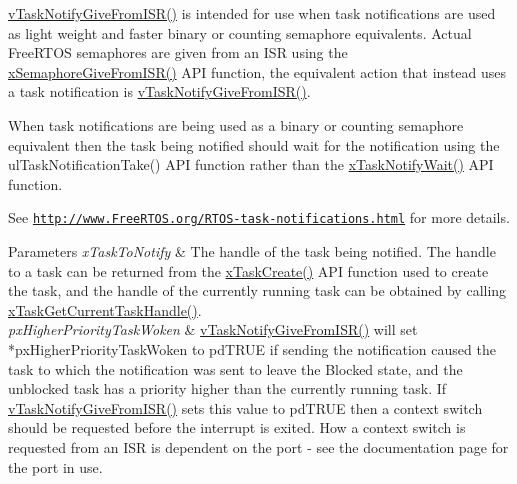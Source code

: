 \begin{DoxyPre}\hyperlink{vendor_2ceedling_2plugins_2freertos_2src_2freertos_2include_2task_8h_a4a4bcf98ad282a596e13f3f30582a11b}{vTaskNotifyGiveFromISR()} is intended for use when task notifications are
used as light weight and faster binary or counting semaphore equivalents.
Actual FreeRTOS semaphores are given from an ISR using the
\hyperlink{externals_2freertos_2include_2semphr_8h_a68aa43df8b2a0dbe17d05fad74670ef0}{xSemaphoreGiveFromISR()} API function, the equivalent action that instead uses
a task notification is \hyperlink{vendor_2ceedling_2plugins_2freertos_2src_2freertos_2include_2task_8h_a4a4bcf98ad282a596e13f3f30582a11b}{vTaskNotifyGiveFromISR()}.\end{DoxyPre}



\begin{DoxyPre}When task notifications are being used as a binary or counting semaphore
equivalent then the task being notified should wait for the notification
using the ulTaskNotificationTake() API function rather than the
\hyperlink{vendor_2ceedling_2plugins_2freertos_2src_2freertos_2include_2task_8h_a0475fcda9718f403521c270a7270ff93}{xTaskNotifyWait()} API function.\end{DoxyPre}



\begin{DoxyPre}See \href{http://www.FreeRTOS.org/RTOS-task-notifications.html}{\tt http://www.FreeRTOS.org/RTOS-task-notifications.html} for more details.\end{DoxyPre}



\begin{DoxyPre}
\begin{DoxyParams}{Parameters}
{\em xTaskToNotify} & The handle of the task being notified.  The handle to a
task can be returned from the \hyperlink{vendor_2ceedling_2plugins_2freertos_2src_2freertos_2include_2task_8h_adf67e7cd0bfd1eda9e8afd048206f7c2}{xTaskCreate()} API function used to create the
task, and the handle of the currently running task can be obtained by calling
\hyperlink{externals_2freertos_2include_2task_8h_a85a0f9c9f817b18686efbf8f37c72dfc}{xTaskGetCurrentTaskHandle()}.\\
\hline
{\em pxHigherPriorityTaskWoken} & \hyperlink{vendor_2ceedling_2plugins_2freertos_2src_2freertos_2include_2task_8h_a4a4bcf98ad282a596e13f3f30582a11b}{vTaskNotifyGiveFromISR()} will set
*pxHigherPriorityTaskWoken to pdTRUE if sending the notification caused the
task to which the notification was sent to leave the Blocked state, and the
unblocked task has a priority higher than the currently running task.  If
\hyperlink{vendor_2ceedling_2plugins_2freertos_2src_2freertos_2include_2task_8h_a4a4bcf98ad282a596e13f3f30582a11b}{vTaskNotifyGiveFromISR()} sets this value to pdTRUE then a context switch
should be requested before the interrupt is exited.  How a context switch is
requested from an ISR is dependent on the port - see the documentation page
for the port in use.
\\
\hline
\end{DoxyParams}
\end{DoxyPre}
